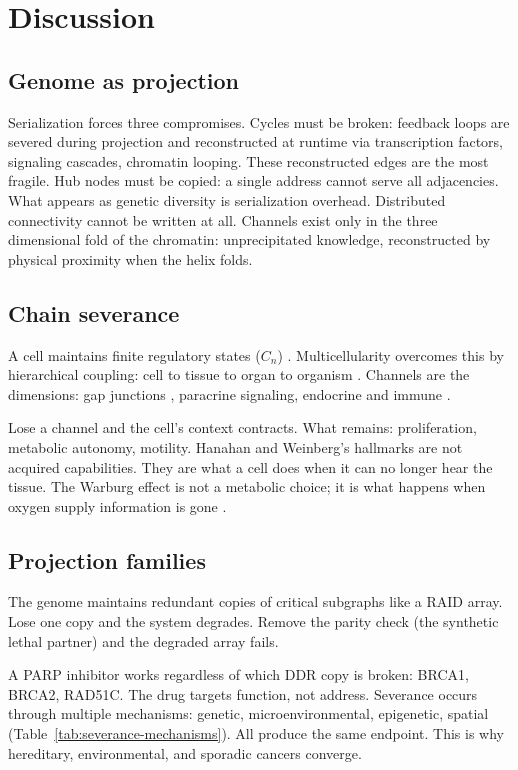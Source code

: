 \documentclass[11pt]{article}
\begin{document}
\section*{Discussion}

\subsection*{Genome as projection}

Serialization forces three compromises. Cycles must be broken:
feedback loops are severed during projection and reconstructed at
runtime via transcription factors, signaling cascades, chromatin
looping. These reconstructed edges are the most fragile. Hub nodes
must be copied: a single address cannot serve all adjacencies. What
appears as genetic diversity is serialization overhead. Distributed
connectivity cannot be written at all. Channels exist only in the
three dimensional fold of the chromatin: unprecipitated knowledge,
reconstructed by physical proximity when the helix folds.

\subsection*{Chain severance}

A cell maintains finite regulatory states ($C_n$) \cite{Cowan2001}.
Multicellularity overcomes this by hierarchical coupling: cell to
tissue to organ to organism \cite{McCarthy2026_BCA}. Channels are the
dimensions: gap junctions \cite{Aasen2016}, paracrine signaling,
endocrine and immune \cite{Hanahan2011}.

Lose a channel and the cell's context contracts. What remains:
proliferation, metabolic autonomy, motility. Hanahan and Weinberg's
hallmarks \cite{Hanahan2011} are not acquired capabilities. They are
what a cell does when it can no longer hear the tissue. The Warburg
effect is not a metabolic choice; it is what happens when oxygen
supply information is gone \cite{Warburg1956}.

\subsection*{Projection families}

The genome maintains redundant copies of critical subgraphs like a
RAID array. Lose one copy and the system degrades. Remove the parity
check (the synthetic lethal partner) and the degraded array fails.

A PARP inhibitor works regardless of which DDR copy is broken:
BRCA1, BRCA2, RAD51C. The drug targets function, not address.
Severance occurs through multiple mechanisms: genetic,
microenvironmental, epigenetic, spatial
(Table~\ref{tab:severance-mechanisms}). All produce the same
endpoint. This is why hereditary, environmental, and sporadic
cancers converge.
\end{document}
